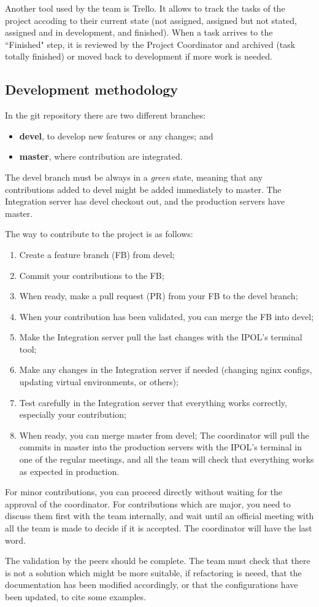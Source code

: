Another tool used by the team is Trello. It allows to track the tasks of the project accoding to their current state (not assigned, assigned but not stated, assigned and in development, and finished). When a task arrives to the ``Finished" step, it is reviewed by the Project Coordinator and archived (task totally finished) or moved back to development if more work is needed.

\subsection{Development methodology}
In the git repository there are two different branches:
\begin{itemize}
	\item \textbf{devel}, to develop new features or any changes; and
	\item \textbf{master}, where contribution are integrated.
\end{itemize}

The devel branch must be always in a \emph{green} state, meaning that any contributions added to devel might be added immediately to master. The Integration server has devel checkout out, and the production servers have master.

The way to contribute to the project is as follows:
\begin{enumerate}
	\item Create a feature branch (FB) from devel;
	\item Commit your contributions to the FB;
	\item When ready, make a pull request (PR) from your FB to the devel branch;
	\item When your contribution has been validated, you can merge the FB into devel;
	\item Make the Integration server pull the last changes with the IPOL's terminal tool;
	\item Make any changes in the Integration server if needed (changing nginx configs, updating virtual environments, or others);
	\item Test carefully in the Integration server that everything works correctly, especially your contribution;
	\item When ready, you can merge master from devel;
	\teim The coordinator will pull the commits in master into the production servers with the IPOL's terminal in one of the regular meetings, and all the team will check that everything works as expected in production.
\end{enumerate}

For minor contributions, you can proceed directly without waiting for the approval of the coordinator.
For contributions which are major, you need to discuss them first with the team internally, and wait until an official meeting with all the team is made to decide if it is accepted. The coordinator will have the last word.

The validation by the peers should be complete. The team must check that there is not a solution which might be more suitable, if refactoring is neeed, that the documentation has been modified accordingly, or that the configurations have been updated, to cite some examples.
